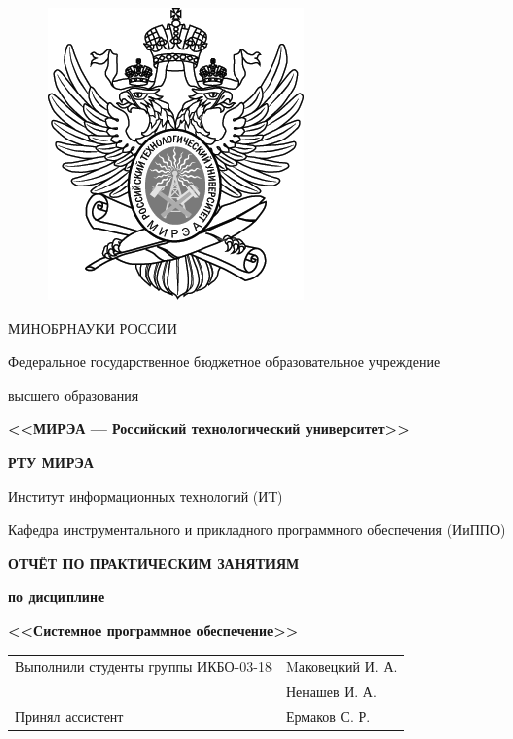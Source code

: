 \begin{titlepage}
\newpage

\begin{figure}
	\centering
	\includegraphics{images/insigne.eps}
\end{figure}

\begin{center}
	\small{МИНОБРНАУКИ РОССИИ}

	\small{Федеральное государственное бюджетное образовательное учреждение} 
	

	\small{высшего образования}

	\textbf{<<МИРЭА --- Российский технологический университет>>}

	\large{\textbf{РТУ МИРЭА}}
\end{center}

\hrulefill


\begin{center}
	\small{Институт информационных технологий (ИТ)}

	\small{Кафедра инструментального и прикладного программного обеспечения (ИиППО)}
\end{center}

\vspace{0,9 cm}
	
\begin{center}
	\small{\textbf{ОТЧЁТ ПО ПРАКТИЧЕСКИМ ЗАНЯТИЯМ}}
	
	\small{\textbf{по дисциплине}}

	\normalsize{\textbf{<<Системное программное обеспечение>>}}
\end{center}

\vspace{0,9 cm}

\begin{tabular} {p{290pt} l }
	\small{Выполнили студенты группы ИКБО-03-18} & \small{Mаковецкий И. А.} \\
	\small{} & \small{Ненашев И. А.} \\ [0,9 cm]
	\small{Принял ассистент} & \small{Ермаков С. Р.} 
\end{tabular}


\end{titlepage}
